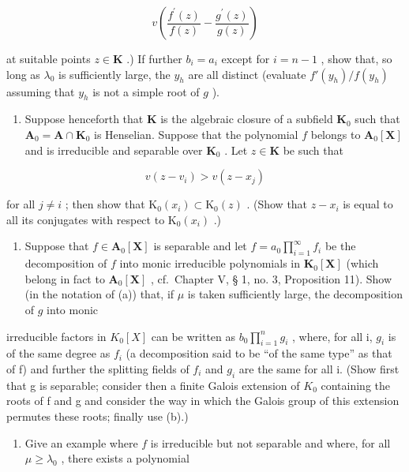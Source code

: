 \[
v \left(\frac {f ^ {\prime} (z)}{f (z)} - \frac {g ^ {\prime} (z)}{g (z)}\right)
\]

at suitable points \(z \in \mathbf{K}\) .) If further \(b_{i} = a_{i}\) except for \(i = n - 1\) , show that, so long as \(\lambda_0\) is sufficiently large, the \(y_{h}\) are all distinct (evaluate \(f'(y_h)/f(y_h)\) assuming that \(y_{h}\) is not a simple root of \(g\) ).

\begin{enumerate}
\def\labelenumi{(\alph{enumi})}
\setcounter{enumi}{1}
\tightlist
\item
  Suppose henceforth that \(\mathbf{K}\) is the algebraic closure of a subfield \(\mathbf{K}_0\) such that \(\mathbf{A}_0 = \mathbf{A} \cap \mathbf{K}_0\) is Henselian. Suppose that the polynomial \(f\) belongs to \(\mathbf{A}_0[\mathbf{X}]\) and is irreducible and separable over \(\mathbf{K}_0\) . Let \(z \in \mathbf{K}\) be such that
\end{enumerate}

\[
v (z - v _ {i}) > v (z - x _ {j})
\]

for all \(j \neq i\) ; then show that \(\mathrm{K}_0(x_i) \subset \mathrm{K}_0(z)\) . (Show that \(z - x_i\) is equal to all its conjugates with respect to \(\mathrm{K}_0(x_i)\) .)

\begin{enumerate}
\def\labelenumi{(\alph{enumi})}
\setcounter{enumi}{2}
\tightlist
\item
  Suppose that \(f \in \mathbf{A}_0[\mathbf{X}]\) is separable and let \(f = a_0 \prod_{i=1}^{\infty} f_i\) be the decomposition of \(f\) into monic irreducible polynomials in \(\mathbf{K}_0[\mathbf{X}]\) (which belong in fact to \(\mathbf{A}_0[\mathbf{X}]\) , cf.~Chapter V, § 1, no. 3, Proposition 11). Show (in the notation of (a)) that, if \(\mu\) is taken sufficiently large, the decomposition of \(g\) into monic
\end{enumerate}

irreducible factors in \(K_{0}[X]\) can be written as \(b_{0}\prod_{i=1}^{n}g_{i}\) , where, for all i, \(g_{i}\) is of the same degree as \(f_{i}\) (a decomposition said to be ``of the same type'' as that of f) and further the splitting fields of \(f_{i}\) and \(g_{i}\) are the same for all i. (Show first that g is separable; consider then a finite Galois extension of \(K_{0}\) containing the roots of f and g and consider the way in which the Galois group of this extension permutes these roots; finally use (b).)

\begin{enumerate}
\def\labelenumi{(\alph{enumi})}
\setcounter{enumi}{3}
\tightlist
\item
  Give an example where \(f\) is irreducible but not separable and where, for all \(\mu \geqslant \lambda_0\) , there exists a polynomial
\end{enumerate}

